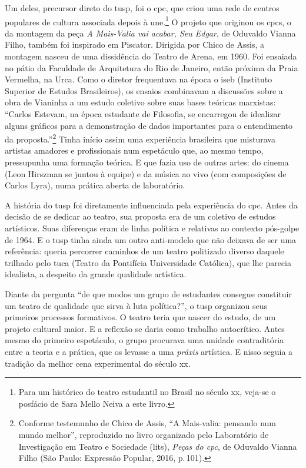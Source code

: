 Um deles, precursor direto do {\sc tusp}, foi o {\sc cpc}, que criou uma rede de
centros populares de cultura associada depois à {\sc une}.\footnote{Para um
  histórico do teatro estudantil no Brasil no século {\sc xx}, veja-se o
  posfácio de Sara Mello Neiva a este livro.} O projeto que originou os
{\sc cpc}s, o da montagem da peça {\it A Mais-Valia vai acabar, Seu Edgar}, de
Oduvaldo Vianna Filho, também foi inspirado em Piscator. Dirigida por
Chico de Assis, a montagem nasceu de uma dissidência do Teatro de Arena,
em 1960. Foi ensaiada no pátio da Faculdade de Arquitetura do Rio de
Janeiro, então próxima da Praia Vermelha, na Urca. Como o diretor
frequentava na época o {\sc iseb} (Instituto Superior de Estudos Brasileiros),
os ensaios combinavam a discussões sobre a obra de Vianinha a um estudo
coletivo sobre suas bases teóricas marxistas: “Carlos Estevam, na época
estudante de Filosofia, se encarregou de idealizar alguns gráficos para
a demonstração de dados importantes para o entendimento da
proposta.”\footnote{Conforme testemunho de Chico de Assis, “A
  Mais-valia: pensando num mundo melhor”, reproduzido no livro
  organizado pelo Laboratório de Investigação em Teatro e Sociedade
  ({\sc lits}), {\it Peças do {\sc cpc}}, de Oduvaldo Vianna Filho (São Paulo:
  Expressão Popular, 2016, p.\,101).} Tinha início assim uma experiência
brasileira que misturava artistas amadores e profissionais num
espetáculo que, ao mesmo tempo, pressupunha uma formação teórica. E que
fazia uso de outras artes: do cinema (Leon Hirszman se juntou à equipe)
e da música ao vivo (com composições de Carlos Lyra), numa prática
aberta de laboratório.

A história do {\sc tusp} foi diretamente influenciada pela experiência do {\sc cpc}.
Antes da decisão de se dedicar ao teatro, sua proposta era de um
coletivo de estudos artísticos. Suas diferenças eram de linha política e
relativas ao contexto pós-golpe de 1964. E o {\sc tusp} tinha ainda um outro
anti-modelo que não deixava de ser uma referência: queria percorrer
caminhos de um teatro politizado diverso daquele trilhado pelo {\sc tuca}
(Teatro da Pontifícia Universidade Católica), que lhe parecia idealista,
a despeito da grande qualidade artística.

Diante da pergunta “de que modos um grupo de estudantes consegue
constituir um teatro de qualidade que sirva à luta política?”, o {\sc tusp}
organizou seus primeiros processos formativos. O teatro teria que nascer
do estudo, de um projeto cultural maior. E a reflexão se daria como
trabalho autocrítico. Antes mesmo do primeiro espetáculo, o grupo
procurava uma unidade contraditória entre a teoria e a prática, que os
levasse a uma {\it práxis} artística. E nisso seguia a tradição da
melhor cena experimental do século {\sc xx}.


